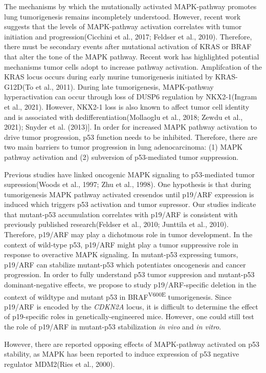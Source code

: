 The mechanisms by which the mutationally activated MAPK-pathway promotes lung tumorigenesis remains incompletely understood. However, recent work suggests that the levels of MAPK-pathway activation correlates with tumor initiation and progression(Cicchini et al., 2017; Feldser et al., 2010). Therefore, there must be secondary events after mutational activation of KRAS or BRAF that alter the tone of the MAPK pathway. Recent work has highlighted potential mechanisms tumor cells adopt to increase pathway activation. Amplifcation of the KRAS locus occurs during early murine tumorigenesis initiated by KRAS-G12D(To et al., 2011). During late tumorigenesis, MAPK-pathway hyperactivation can occur through loss of DUSP6 regulation by NKX2-1(Ingram et al., 2021). However, NKX2-1 loss is also known to affect tumor cell identity and is associated with dedifferentiation(Mollaoglu et al., 2018; Zewdu et al., 2021); Snyder et al. (2013){]}. In order for increased MAPK pathway activation to drive tumor progression, p53 function needs to be inhibited. Therefore, there are two main barriers to tumor progression in lung adenocarcinoma: (1) MAPK pathway activation and (2) subversion of p53-mediated tumor suppression.

Previous studies have linked oncogenic MAPK signaling to p53-mediated tumor supression(Woods et al., 1997; Zhu et al., 1998). One hypothesis is that during tumorigenesis MAPK pathway activated cresendos until p19/ARF expression is induced which triggers p53 activation and tumor supressor. Our studies indicate that mutant-p53 accumulation correlates with p19/ARF is consistent with previously published research(Feldser et al., 2010; Junttila et al., 2010). Therefore, p19/ARF may play a dichotmous role in tumor development. In the context of wild-type p53, p19/ARF might play a tumor suppressive role in response to overactive MAPK signaling. In mutant-p53 expressing tumors, p19/ARF can stabilize mutant-p53 which potentiates oncogenesis and cancer progression. In order to fully understand p53 tumor suppresion and mutant-p53 dominant-negative effects, we propose to study p19/ARF-specific deletion in the context of wildtype and mutant p53 in BRAF\textsuperscript{V600E} tumorigenesis. Since p19/ARF is encoded by the \emph{CDKN2A} locus, it is difficult to determine the effect of p19-specific roles in genetically-engineered mice. However, one could still test the role of p19/ARF in mutant-p53 stabilization \emph{in vivo} and \emph{in vitro}.

However, there are reported opposing effects of MAPK-pathway activated on p53 stability, as MAPK has been reported to induce expression of p53 negative regulator MDM2(Ries et al., 2000).


